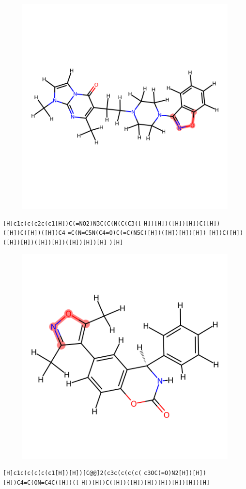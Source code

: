 \documentclass{article}
\begin{document}
\begin{figure}[ht]
\centering
    \includegraphics{mol28.png}
\end{figure}
\verb|[H]c1c(c(c2c(c1[H])C(=NO2)N3C(C(N(C(C3([| \verb|H])[H])([H])[H])C([H])([H])C([H])([H])C4| \verb|=C(N=C5N(C4=O)C(=C(N5C([H])([H])[H])[H])| \verb|[H])C([H])([H])[H])([H])[H])([H])[H])[H]| \verb|)[H]|

\begin{figure}[ht]
\centering
    \includegraphics{mol29.png}
\end{figure}
\verb|[H]c1c(c(c(c(c1[H])[H])[C@@]2(c3c(c(c(c(| \verb|c3OC(=O)N2[H])[H])[H])C4=C(ON=C4C([H])([| \verb|H])[H])C([H])([H])[H])[H])[H])[H])[H]|
\end{document}
